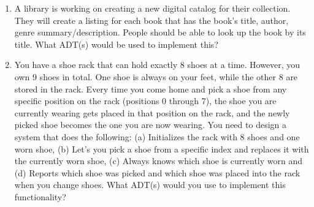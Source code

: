 \documentclass{article}
\begin{document}
\begin{enumerate}
\item 
  A library is working on creating a new digital catalog for their
  collection. They will create a listing for each book that has the book's title, author, genre summary/description. People should be able to look up the book by its title. What ADT(s) would be used to implement this?
  
\item 
  You have a shoe rack that can hold exactly 8 shoes at a time. However, you own 9 shoes in total.
One shoe is always on your feet, while the other 8 are stored in the rack. Every time you come
home and pick a shoe from any specific position on the rack (positions 0 through 7), the shoe
you are currently wearing gets placed in that position on the rack, and the newly picked shoe
becomes the one you are now wearing.
You need to design a system that does the following:
(a) Initializes the rack with 8 shoes and one worn shoe,
(b) Let's you pick a shoe from a specific index and replaces it with
the currently worn shoe,
(c) Always knows which shoe is currently worn and
(d) Reports which shoe was picked and which shoe was placed into
    the rack when you change shoes.
What ADT(s) would you use to implement this functionality?

\end{enumerate}
\end{document}
